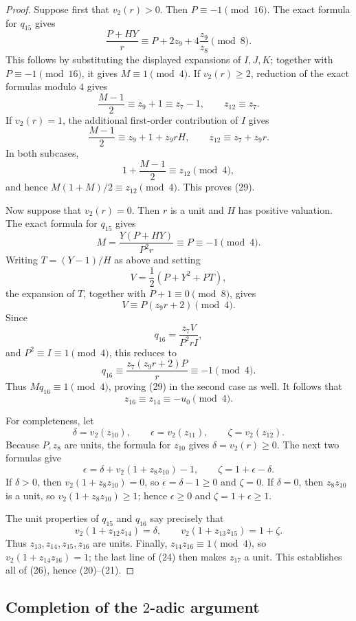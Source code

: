 \documentclass[11pt]{article}
\theoremstyle{remark}
\newcommand{\vt}{v_2}
\begin{document}
\begin{proof}
Suppose first that \(\vt(r)>0\).  Then
\(P\equiv-1\pmod{16}\).  The exact formula for \(q_{15}\) gives
\[
 \frac{P+HY}{r}\equiv
 P+2z_9+4\frac{z_9}{z_8}\pmod8.
\]
This follows by substituting the displayed expansions of \(I,J,K\);
together with \(P\equiv-1\pmod{16}\), it gives
\(M\equiv1\pmod4\).  If
\(\vt(r)\geq2\), reduction of the exact formulas modulo \(4\) gives
\[
 \frac{M-1}{2}\equiv z_9+1\equiv z_7-1,\qquad
 z_{12}\equiv z_7.
\]
If \(\vt(r)=1\), the additional first-order contribution of \(I\) gives
\[
 \frac{M-1}{2}\equiv z_9+1+z_9rH,\qquad
 z_{12}\equiv z_7+z_9r.
\]
In both subcases,
\[
 1+\frac{M-1}{2}\equiv z_{12}\pmod4,
\]
and hence \(M(1+M)/2\equiv z_{12}\pmod4\).  This proves (29).

Now suppose that \(\vt(r)=0\).  Then \(r\) is a unit and \(H\) has
positive valuation.  The exact formula for \(q_{15}\) gives
\[
 M=\frac{Y(P+HY)}{P^2r}\equiv P\equiv-1\pmod4.
\]
Writing \(T=(Y-1)/H\) as above and setting
\[
 V=\frac12(P+Y^2+PT),
\]
the expansion of \(T\), together with \(P+1\equiv0\pmod8\), gives
\[
 V\equiv P(z_9r+2)\pmod4.
\]
Since
\[
 q_{16}=\frac{z_7V}{P^2rI},
\]
and \(P^2\equiv I\equiv1\pmod4\), this reduces to
\[
 q_{16}\equiv
 \frac{z_7(z_9r+2)P}{r}\equiv-1\pmod4.
\]  Thus
\(Mq_{16}\equiv1\pmod4\), proving (29) in the second case as well.
It follows that
\[
 z_{16}\equiv z_{14}\equiv-u_0\pmod4.
\]

For completeness, let
\[
 \delta=\vt(z_{10}),\qquad
 \epsilon=\vt(z_{11}),\qquad
 \zeta=\vt(z_{12}).
\]
Because \(P,z_8\) are units, the formula for \(z_{10}\) gives
\(\delta=\vt(r)\geq0\).  The next two formulas give
\[
 \epsilon=\delta+\vt(1+z_8z_{10})-1,\qquad
 \zeta=1+\epsilon-\delta.
\]
If \(\delta>0\), then \(\vt(1+z_8z_{10})=0\), so
\(\epsilon=\delta-1\geq0\) and \(\zeta=0\).  If \(\delta=0\), then
\(z_8z_{10}\) is a unit, so
\(\vt(1+z_8z_{10})\geq1\); hence \(\epsilon\geq0\) and
\(\zeta=1+\epsilon\geq1\).

The unit properties of \(q_{15}\) and \(q_{16}\) say precisely that
\[
 \vt(1+z_{12}z_{14})=\delta,\qquad
 \vt(1+z_{13}z_{15})=1+\zeta.
\]
Thus \(z_{13},z_{14},z_{15},z_{16}\) are units.  Finally,
\(z_{14}z_{16}\equiv1\pmod4\), so
\(\vt(1+z_{14}z_{16})=1\); the last line of (24) then makes \(z_{17}\)
a unit.  This establishes all of (26), hence (20)--(21).
\end{proof}

\subsection{Completion of the $2$-adic argument}
\end{document}
